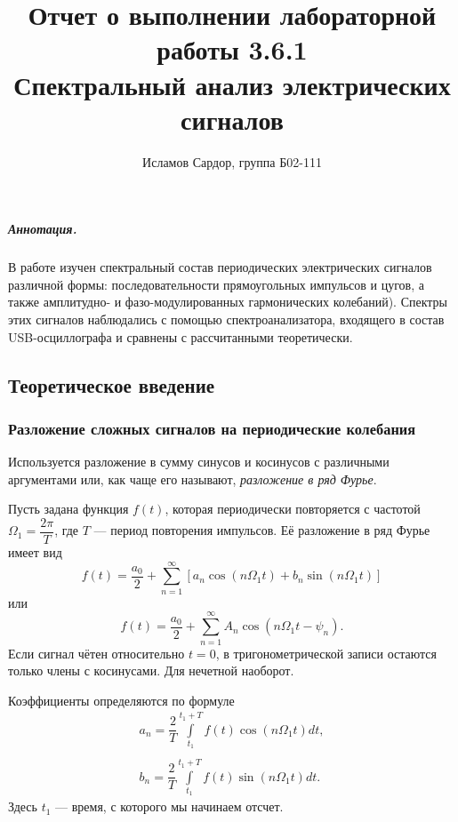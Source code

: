 \documentclass[12pt,a4paper]{article}
\title{
Отчет о выполнении лабораторной работы 3.6.1 \\
Спектральный анализ электрических сигналов}
\author{Исламов Сардор, группа Б02-111}
\begin{document}
\maketitle

\subparagraph*{Аннотация.} 
В работе изучен спектральный состав периодических электрических сигналов различной формы: последовательности прямоугольных импульсов и цугов, а также амплитудно- и фазо-модулированных гармонических колебаний).
Спектры этих сигналов наблюдались с помощью спектроанализатора, входящего в состав USB-осциллографа и сравнены с рассчитанными теоретически.

\subsection*{Теоретическое введение}

\subsubsection*{Разложение сложных сигналов на периодические колебания}
Используется разложение в сумму синусов и косинусов с различными аргументами или, как чаще его называют, \textit{разложение в ряд Фурье}.

Пусть задана функция $f(t)$, которая периодически повторяется с частотой $\Omega_1 = \dfrac{2\pi}{T}$, где $T$ --- период повторения импульсов. Её разложение в ряд Фурье имеет вид 
\begin{equation}
f(t) = \dfrac{a_0}{2} + \sum\limits_{n = 1}^{\infty}\left[a_n \cos \left(n \Omega_1t\right) + b_n \sin \left(n \Omega_1t\right)\right]
\end{equation}
или
\begin{equation}
f(t) = \dfrac{a_0}{2} + \sum\limits_{n = 1}^{\infty}A_n \cos \left(n\Omega_1t-\psi_n\right).
\end{equation}
Если сигнал чётен относительно $t=0$, в тригонометрической записи остаются только члены с косинусами. Для нечетной наоборот.

Коэффициенты определяются по формуле
\begin{equation}
\begin{array}{c}
a_n  = \dfrac{2}{T}\int\limits_{t_1}^{t_1+T}f(t)\cos\left(n \Omega_1 t\right) dt,\\
\\
b_n = \dfrac{2}{T}\int\limits_{t_1}^{t_1+T}f(t)\sin\left(n \Omega_1 t\right) dt.
\end{array}
\end{equation}
Здесь $t_1$ --- время, с которого мы начинаем отсчет.
\end{document}
